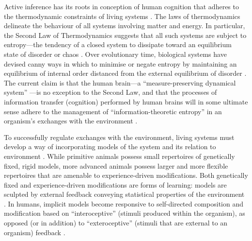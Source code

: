 \begin{CJK}{UTF8}{gbsn}
Active inference has its roots in conception of human cognition that adheres to the thermodynamic constraints of living systems \citep{Yufik2017}.  The laws of thermodynamics delineate the behaviour of all systems involving matter and energy.  In particular, the Second Law of Thermodynamics suggests that all such systems are subject to entropy---the tendency of a closed system to dissipate toward an equilibrium state of disorder or chaos \citep{Wolfram2002}.  Over evolutionary time, biological systems have devised canny ways in which to minimise or negate entropy by maintaining an equilibrium of internal order distanced from the external equilibrium of disorder \citep{Schrodinger1944}.  The current claim is that the human brain---a ``measure-preserving dynamical system'' \citep[c.f.][]{Friston2013}---is no exception to the Second Law, and that the processes of information transfer (cognition) performed by human brains will in some ultimate sense adhere to the management of ``information-theoretic entropy'' in an organism's exchanges with the environment \citep{Yufik2002,Yufik2013,Friston2010,Sengupta2013,Sengupta2016,Sengupta2017}.

To successfully regulate exchanges with the environment, living systems must develop a way of incorporating models of the system and its relation to environment \citep{Conant1970}.  While primitive animals possess small repertoires of genetically fixed, rigid models, more advanced animals possess larger and more flexible repertoires that are amenable to experience-driven modifications.  Both genetically fixed and experience-driven modifications are forms of learning: models are sculpted by external feedback conveying statistical properties of the environment \citep{Yufik2013}.  In humans, implicit models become responsive to self-directed composition and modification based on ``interoceptive'' (stimuli produced within the organism), as opposed (or in addition) to ``exteroceptive'' (stimuli that are external to an organism) feedback \citep{Yufik1998,FeldmanBarrett2015}.


\end{CJK}
